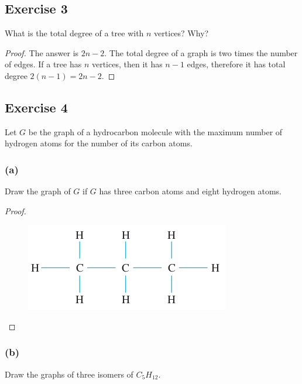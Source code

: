 \documentclass[14pt]{extarticle}
\begin{document}
\subsection{Exercise 3}
What is the total degree of a tree with \(n\) vertices? Why?

\begin{proof}
The answer is \(2n - 2\). The total degree of a graph is two times the number of edges. If a tree has \(n\) vertices, then
it has \(n-1\) edges, therefore it has total degree \(2(n-1) = 2n-2\).
\end{proof}

\subsection{Exercise 4}
Let \(G\) be the graph of a hydrocarbon molecule with the maximum number of hydrogen atoms for the number of its carbon 
atoms.

\subsubsection{(a)}
Draw the graph of \(G\) if \(G\) has three carbon atoms and eight hydrogen atoms.

\begin{proof}
\begin{figure}[ht!]
\centering
\includegraphics[scale=0.45]{../images/10.4.4.a.png}
\end{figure}
\end{proof}

\subsubsection{(b)}
Draw the graphs of three isomers of \(C_5H_{12}\).
\end{document}
